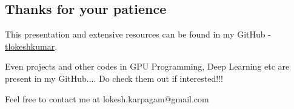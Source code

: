 \documentclass[11pt]{article}
\begin{document}
    \subsection{Thanks for your patience}\label{thanks-for-your-patience}

This presentation and extensive resources can be found in my GitHub -
\href{github.com/tlokeshkumar}{tlokeshkumar}.

Even projects and other codes in GPU Programming, Deep Learning etc are
present in my GitHub.... Do check them out if interested!!!

Feel free to contact me at lokesh.karpagam@gmail.com


    
    
    
    
\end{document}
